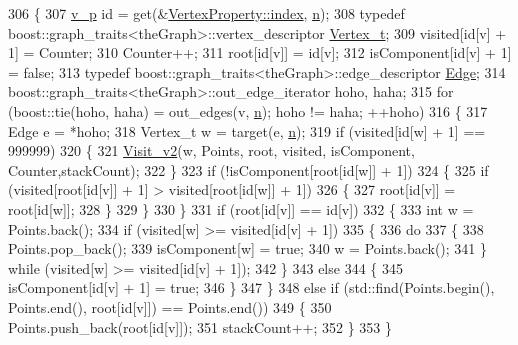 \begin{DoxyCode}
306 \{
307     \hyperlink{utilities_8h_a3f4959b3d837fa6351a9414c79280286}{v\_p} \textcolor{keywordtype}{id} = \textcolor{keyword}{get}(&\hyperlink{struct_utility_structs_1_1_vertex_property_a636cb729438e999aa3d9a17ac39d8641}{VertexProperty::index}, \hyperlink{class_nuutila_a1409929fa0f38709497f8bdb012af71c}{n});
308     \textcolor{keyword}{typedef} boost::graph\_traits<theGraph>::vertex\_descriptor \hyperlink{class_graph_component_ae67114a6ce5a001dc35e1996e1b45aa0}{Vertex\_t};
309     visited[\textcolor{keywordtype}{id}[v] + 1] = Counter;
310     Counter++;
311     root[\textcolor{keywordtype}{id}[v]] = \textcolor{keywordtype}{id}[v];
312     isComponent[\textcolor{keywordtype}{id}[v] + 1] = \textcolor{keyword}{false};
313     \textcolor{keyword}{typedef} boost::graph\_traits<theGraph>::edge\_descriptor \hyperlink{class_graph_component_aa7517b2af08aa717324076a645c73fe6}{Edge};
314     boost::graph\_traits<theGraph>::out\_edge\_iterator hoho, haha;
315     \textcolor{keywordflow}{for} (boost::tie(hoho, haha) = out\_edges(v, \hyperlink{class_nuutila_a1409929fa0f38709497f8bdb012af71c}{n}); hoho != haha; ++hoho)
316     \{
317         Edge e = *hoho;
318         Vertex\_t w = target(e, \hyperlink{class_nuutila_a1409929fa0f38709497f8bdb012af71c}{n});
319         \textcolor{keywordflow}{if} (visited[\textcolor{keywordtype}{id}[w] + 1] == 999999)
320         \{
321             \hyperlink{class_nuutila_afc7a8c27d8de17ac2679f839ff8c2749}{Visit\_v2}(w, Points, root, visited, isComponent, Counter,stackCount);
322         \}
323         \textcolor{keywordflow}{if} (!isComponent[root[\textcolor{keywordtype}{id}[w]] + 1])
324         \{
325             \textcolor{keywordflow}{if} (visited[root[\textcolor{keywordtype}{id}[v]] + 1] > visited[root[\textcolor{keywordtype}{id}[w]] + 1])
326             \{
327                 root[\textcolor{keywordtype}{id}[v]] = root[\textcolor{keywordtype}{id}[w]];
328             \}
329         \}
330     \}
331     \textcolor{keywordflow}{if} (root[\textcolor{keywordtype}{id}[v]] == \textcolor{keywordtype}{id}[v])
332     \{
333         \textcolor{keywordtype}{int} w = Points.back();
334         \textcolor{keywordflow}{if} (visited[w] >= visited[\textcolor{keywordtype}{id}[v] + 1])
335         \{
336             \textcolor{keywordflow}{do}
337             \{
338                 Points.pop\_back();
339                 isComponent[w] = \textcolor{keyword}{true};
340                 w = Points.back();
341             \} \textcolor{keywordflow}{while} (visited[w] >= visited[\textcolor{keywordtype}{id}[v] + 1]);
342         \}
343         \textcolor{keywordflow}{else}
344         \{
345             isComponent[\textcolor{keywordtype}{id}[v] + 1] = \textcolor{keyword}{true};
346         \}
347     \}
348     \textcolor{keywordflow}{else} \textcolor{keywordflow}{if} (std::find(Points.begin(), Points.end(), root[\textcolor{keywordtype}{id}[v]]) == Points.end())
349     \{
350         Points.push\_back(root[\textcolor{keywordtype}{id}[v]]);
351         stackCount++;
352     \}
353 \}
\end{DoxyCode}


